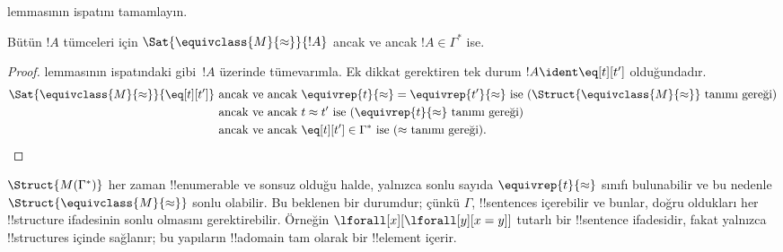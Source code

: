 \begin{prob}
 lemmasının
ispatını tamamlayın.
\end{prob}

\begin{lem}
Bütün $!A$ tümceleri için $\Sat{\equivclass{M}{\approx}}{!A}$ ancak ve
ancak $!A\in\Gamma^*$ ise.
\end{lem}

\begin{proof}
 lemmasının ispatındaki gibi~$!A$ üzerinde
tümevarımla. Ek dikkat gerektiren tek durum $!A\ident\eq[t][t']$
olduğundadır.
\begin{align*}
\Sat{\equivclass{M}{\approx}}{\eq[t][t']} & \text{ ancak ve ancak }
\equivrep{t}{\approx}=\equivrep{t'}{\approx}
\text{ ise ($\Struct{\equivclass{M}{\approx}}$ tanımı gereği)}\\
& \text{ ancak ve ancak } t\approx t'
\text{ ise ($\equivrep{t}{\approx}$ tanımı gereği)}\\
& \text{ ancak ve ancak } \eq[t][t']\in\Gamma^*
\text{ ise ($\approx$ tanımı gereği).}
\end{align*}
\end{proof}

\begin{digress}
$\Struct{M(\Gamma^*)}$ her zaman !!{enumerable} ve sonsuz olduğu halde,
yalnızca sonlu sayıda $\equivrep{t}{\approx}$ sınıfı bulunabilir ve bu
nedenle $\Struct{\equivclass{M}{\approx}}$ sonlu olabilir. Bu beklenen
bir durumdur; çünkü $\Gamma$, !!{sentence}s içerebilir ve bunlar,
doğru oldukları her !!{structure} ifadesinin sonlu olmasını gerektirebilir.
Örneğin $\lforall[x][\lforall[y][x=y]]$ tutarlı bir !!{sentence}
ifadesidir, fakat yalnızca !!{structure}s içinde sağlanır; bu yapıların
!!a{domain} tam olarak bir !!{element} içerir.
\end{digress}

